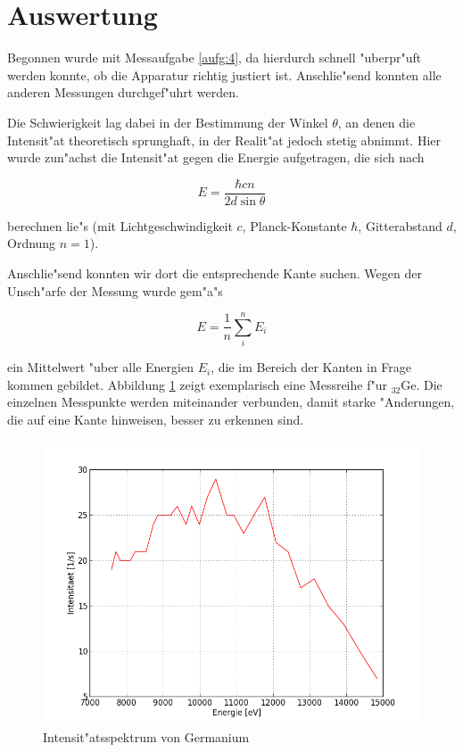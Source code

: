 \section{Auswertung}
	\label{sec:auswertung}
	
	Begonnen wurde mit Messaufgabe \ref{aufg:4}, da hierdurch schnell "uberpr"uft werden konnte, ob die Apparatur richtig justiert ist.
	Anschlie"send konnten alle anderen Messungen durchgef"uhrt werden.

	Die Schwierigkeit lag dabei in der Bestimmung der Winkel $\theta$, an denen die Intensit"at theoretisch sprunghaft, in der Realit"at jedoch stetig abnimmt.
	Hier wurde zun"achst die Intensit"at gegen die Energie aufgetragen, die sich nach 

	\begin{equation}
		E = \frac{\hbar c n}{2 d \sin{\theta}}
		\label{eqn:energie}
	\end{equation}

	berechnen lie"s (mit Lichtgeschwindigkeit $c$, Planck-Konstante $\hbar$, Gitterabstand $d$, Ord\-nung $n = 1$).

	Anschlie"send konnten wir dort die entsprechende Kante suchen.
	Wegen der Unsch"arfe der Messung wurde gem"a"s

	\begin{equation}
		E = \frac{1}{n} \sum_i^n E_i \nonumber
	\end{equation}

	ein Mittelwert "uber alle Energien $E_i$, die im Bereich der Kanten in Frage kommen gebildet.
	Abbildung \ref{fig:germanium} zeigt exemplarisch eine Messreihe f"ur ${}_{32}^{}\mathrm{Ge}$.
	Die einzelnen Mess\-pun\-kte werden miteinander verbunden, damit starke "Anderungen, die auf eine Kante hinweisen, besser zu erkennen sind.

	\begin{figure}[h!]
		\centering
		\includegraphics[width = 13cm]{img/graph_32_fein.png}
		\caption{Intensit"atsspektrum von Germanium}
		\label{fig:germanium}
	\end{figure}

